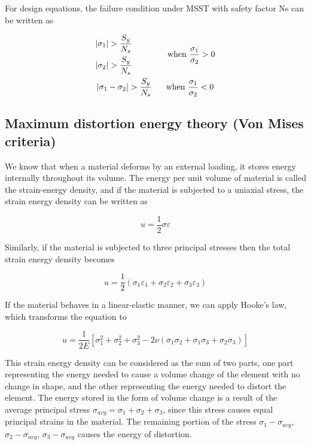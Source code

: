 \documentclass[a4paper,openany,12pt]{book}
\begin{document}
For design equations, the failure condition under MSST with safety
factor Ns can be written as

$$\begin{gathered}
    \begin{gathered}
        \left| \sigma_1 \right| > \frac{S_y}{N_s} \\
        \left| \sigma_2 \right| > \frac{S_y}{N_s}  \\ 
      \end{gathered}  \hspace{1.5cm} \text{when } \dfrac{\sigma _1}{\sigma _2} > 0 \\
      \left| {\sigma _1} - {\sigma _2} \right| > \frac{S_y}{N_s} \hspace{0.6cm} \text{when } \dfrac{\sigma_1}{\sigma_2} < 0
  \end{gathered}$$

\subsection{Maximum distortion energy theory (Von Mises criteria)}
\label{sec:orgc5927b0}
We know that when a material deforms by an external loading, it stores
energy internally throughout its volume. The energy per unit volume of
material is called the strain-energy density, and if the material is
subjected to a uniaxial stress, the strain energy density can be written
as

$$u = \frac{1}{2}\sigma \varepsilon$$

Similarly, if the material is subjected to three principal stresses then
the total strain energy density becomes

$$u = \frac{1}{2}(\sigma_1\varepsilon_1 + \sigma_2\varepsilon_2 + \sigma_3\varepsilon_3)$$

If the material behaves in a linear-elastic manner, we can apply Hooke's
law, which transforms the equation to

$$ u = \frac{1}{2E}\left[\sigma_1^2 + \sigma_2^2 + \sigma_3^2 - 2\nu (\sigma_1\sigma_2 + \sigma_1\sigma_3 + \sigma_2\sigma_3)\right]$$

This strain energy density can be considered as the sum of two parts,
one part representing the energy needed to cause a volume change of the
element with no change in shape, and the other representing the energy
needed to distort the element. The energy stored in the form of volume
change is a result of the average principal stress
\(\sigma_{avg} = \sigma_1 + \sigma_2 + \sigma_3\), since this stress
causes equal principal strains in the material. The remaining portion of
the stress \(\sigma_1 - \sigma_{avg}\), \(\sigma_2 - \sigma_{avg}\),
\(\sigma_3 - \sigma_{avg}\) causes the energy of distortion.
\end{document}

